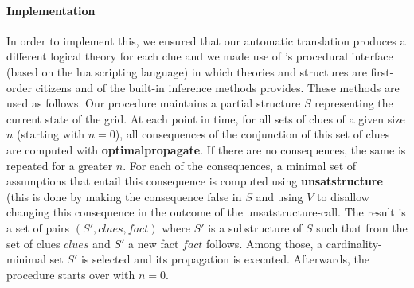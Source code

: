 \paragraph{Implementation}
In order to implement this, we ensured that our automatic translation produces a different logical theory for each clue and we made use of \idp's procedural interface (based on the lua scripting language) in which theories and structures are first-order citizens and of the built-in inference methods \idp provides. 
% 
These methods are used as follows. Our procedure maintains a partial structure $S$ representing the current state of the grid. 
At each point in time, for all sets of clues of a given size $n$ (starting with $n=0$), all consequences of the conjunction of this set of clues are computed with \textbf{optimalpropagate}. 
If there are no consequences, the same is repeated for a greater $n$. 
For each of the consequences, a minimal set of assumptions that entail this consequence is computed using \textbf{unsatstructure} (this is done by making the consequence false in $S$ and using $V$ to disallow changing this consequence in the outcome of the unsatstructure-call. 
The result is a set of pairs $(S',\mathit{clues},\mathit{fact})$ where $S'$ is a substructure of $S$ such that from the set of clues $\mathit{clues}$ and $S'$ a new fact $\mathit{fact}$ follows. Among those, a cardinality-minimal set $S'$ is selected and its propagation is executed. 
Afterwards, the procedure starts over with $n=0$. 

